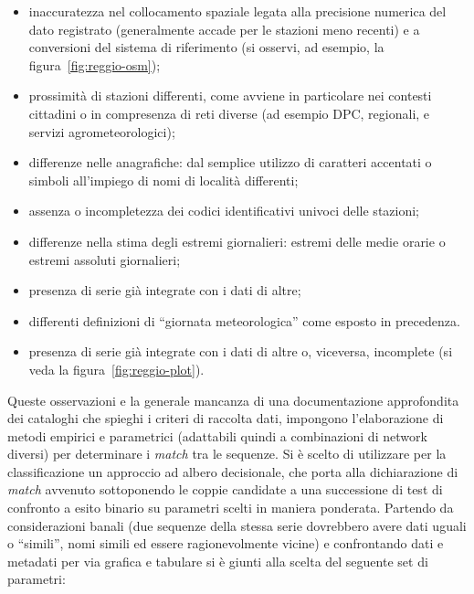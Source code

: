 \begin{itemize}
  \item inaccuratezza nel collocamento spaziale legata alla precisione numerica del dato registrato (generalmente accade per le stazioni meno recenti) e a conversioni del sistema di riferimento (si osservi, ad esempio, la figura~\ref{fig:reggio-osm});
  \item prossimità di stazioni differenti, come avviene in particolare nei contesti cittadini o in compresenza di reti diverse (ad esempio DPC, regionali, e servizi agrometeorologici);
  \item differenze nelle anagrafiche: dal semplice utilizzo di caratteri accentati o simboli all'impiego di nomi di località differenti;
  \item assenza o incompletezza dei codici identificativi univoci delle stazioni;
  \item differenze nella stima degli estremi giornalieri: estremi delle medie orarie o estremi assoluti giornalieri;
  \item presenza di serie già integrate con i dati di altre;
  \item differenti definizioni di ``giornata meteorologica'' come esposto in precedenza.
  \item presenza di serie già integrate con i dati di altre o, viceversa, incomplete (si veda la figura~\ref{fig:reggio-plot}).
\end{itemize}

Queste osservazioni e la generale mancanza di una documentazione approfondita dei cataloghi che spieghi i criteri di raccolta dati, impongono l'elaborazione di metodi empirici e parametrici (adattabili quindi a combinazioni di network diversi) per determinare i \emph{match} tra le sequenze. Si è scelto di utilizzare per la classificazione un approccio ad albero decisionale, che porta alla dichiarazione di \emph{match} avvenuto sottoponendo le coppie candidate a una successione di test di confronto a esito binario su parametri scelti in maniera ponderata. Partendo da considerazioni banali (due sequenze della stessa serie dovrebbero avere dati uguali o ``simili'', nomi simili ed essere ragionevolmente vicine) e confrontando dati e metadati per via grafica e tabulare si è giunti alla scelta del seguente set di parametri:

